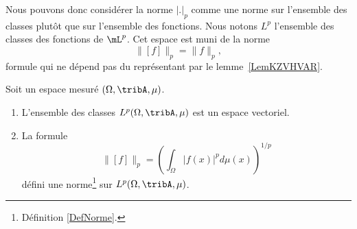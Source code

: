 Nous pouvons donc considérer la norme \( | . |_p\) comme une norme sur l'ensemble des classes plutôt que sur l'ensemble des fonctions. Nous notons \( L^p\) l'ensemble des classes des fonctions de \(\mL^p\). Cet espace est muni de la norme
\begin{equation}
    \| [f] \|_p=\| f \|_p,
\end{equation}
formule qui ne dépend pas du représentant par le lemme~\ref{LemKZVHVAR}.

\begin{proposition}     \label{PROPooTYCYooAKJWOX}
    Soit un espace mesuré \( (\Omega,\tribA,\mu)\). 
    \begin{enumerate}
        \item
            L'ensemble des classes \( L^p(\Omega,\tribA,\mu)\) est un espace vectoriel.
        \item
            La formule
            \begin{equation}
                \| [f] \|_p=\left( \int_{\Omega}| f(x) |^pd\mu(x) \right)^{1/p}
            \end{equation}
            défini une norme\footnote{Définition \ref{DefNorme}.} sur \( L^p(\Omega,\tribA,\mu)\). 
            \end{enumerate}
\end{proposition}

